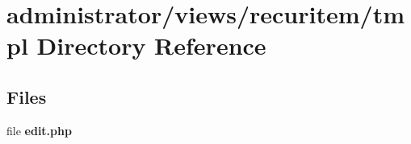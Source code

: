 \section{administrator/views/recuritem/tmpl Directory Reference}
\label{dir_7c682611403c30f30b7c507a607ed0d5}
\subsection*{Files}
\begin{DoxyCompactItemize}
\item 
file \textbf{ edit.\+php}
\end{DoxyCompactItemize}
